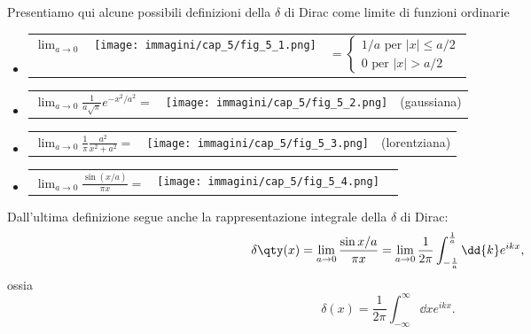 Presentiamo qui alcune possibili definizioni della $\delta$ di Dirac come limite di funzioni ordinarie
\begin{itemize}
\item
\begin{tabular}{ >{\centering\arraybackslash} m{1.5cm} >{\centering\arraybackslash} m{3.5cm} >{\centering\arraybackslash} m{4.5cm}}
$\displaystyle{\lim _{a \rightarrow 0}}$ & \texttt{[image: immagini/cap\_5/fig\_5\_1.png]}  & $=\displaystyle{\begin{cases}
1/a \textrm{ per } \vert x \vert \leq a/2\\
0 \textrm{ per } \vert x \vert > a/2
\end{cases}}$
\end{tabular}
\item
\begin{tabular}{ >{\centering\arraybackslash} m{4cm} >{\centering\arraybackslash} m{3.5cm} >{\centering\arraybackslash} m{2cm}}
$\displaystyle{\lim _{a \rightarrow 0}\frac{1}{a\sqrt{\pi}}e^{-x^2/a^2}=}$ & \texttt{[image: immagini/cap\_5/fig\_5\_2.png]}  & (gaussiana)
\end{tabular}
\item 
\begin{tabular}{ >{\centering\arraybackslash} m{4cm} >{\centering\arraybackslash} m{3.5cm} >{\centering\arraybackslash} m{2cm}}
$\displaystyle{\lim _{a \rightarrow 0}\frac{1}{\pi}\frac{a^2}{x^2+a^2}}=$ & \texttt{[image: immagini/cap\_5/fig\_5\_3.png]}  & (lorentziana)
\end{tabular}
\item 
\begin{tabular}{ >{\centering\arraybackslash} m{4cm} >{\centering\arraybackslash} m{3.5cm} >{\centering\arraybackslash} m{2cm}}
$\displaystyle{\lim _{a \rightarrow 0}\frac{\sin(x/a)}{\pi x}}=$ & \texttt{[image: immagini/cap\_5/fig\_5\_4.png]}  & 
\end{tabular}
\end{itemize}
Dall'ultima definizione segue anche la rappresentazione integrale della $\delta$ di Dirac:
\begin{equation}
  \delta\qty(x) = \lim_{a\to0}\frac{\sin{x/a}}{\pi x}=\lim_{a\to0}\frac{1}{2\pi}\int_{-\frac{1}{a}}^{\frac{1}{a}}\dd{k}e^{ikx} ,
\end{equation}
ossia
\begin{equation}
  \delta(x)=\frac{1}{2\pi}\int_{-\infty}^{\infty}\dd{x}e^{ikx} .
\end{equation}
